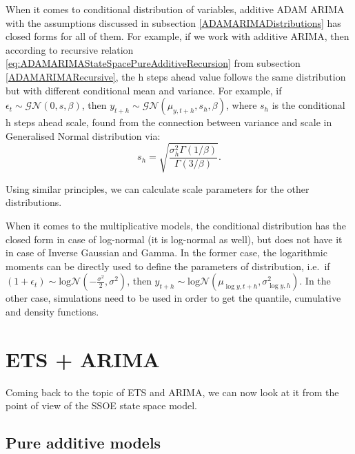 \documentclass[
]{book}
\theoremstyle{definition}
\theoremstyle{definition}
\theoremstyle{definition}
\theoremstyle{definition}
\theoremstyle{remark}
\begin{document}
When it comes to conditional distribution of variables, additive ADAM ARIMA with the assumptions discussed in subsection \ref{ADAMARIMADistributions} has closed forms for all of them. For example, if we work with additive ARIMA, then according to recursive relation \eqref{eq:ADAMARIMAStateSpacePureAdditiveRecursion} from subsection \ref{ADAMARIMARecursive}, the h steps ahead value follows the same distribution but with different conditional mean and variance. For example, if \(\epsilon_t \sim \mathcal{GN}(0, s, \beta)\), then \(y_{t+h} \sim \mathcal{GN}(\mu_{y,t+h}, s_{h}, \beta)\), where \(s_{h}\) is the conditional h steps ahead scale, found from the connection between variance and scale in Generalised Normal distribution via:
\begin{equation*}
    s_h = \sqrt{\frac{\sigma^2_h \Gamma(1/\beta)}{\Gamma(3/\beta)}}.
\end{equation*}

Using similar principles, we can calculate scale parameters for the other distributions.

When it comes to the multiplicative models, the conditional distribution has the closed form in case of log-normal (it is log-normal as well), but does not have it in case of Inverse Gaussian and Gamma. In the former case, the logarithmic moments can be directly used to define the parameters of distribution, i.e.~if \(\left(1+\epsilon_t \right) \sim \text{log}\mathcal{N}\left(-\frac{\sigma^2}{2}, \sigma^2\right)\), then \(y_{t+h} \sim \text{log}\mathcal{N}\left(\mu_{\log y,t+h}, \sigma^2_{\log y,h} \right)\). In the other case, simulations need to be used in order to get the quantile, cumulative and density functions.

\hypertarget{ETSAndARIMA}{%
\section{ETS + ARIMA}\label{ETSAndARIMA}}

Coming back to the topic of ETS and ARIMA, we can now look at it from the point of view of the SSOE state space model.

\hypertarget{pure-additive-models}{%
\subsection{Pure additive models}\label{pure-additive-models}}
\end{document}

